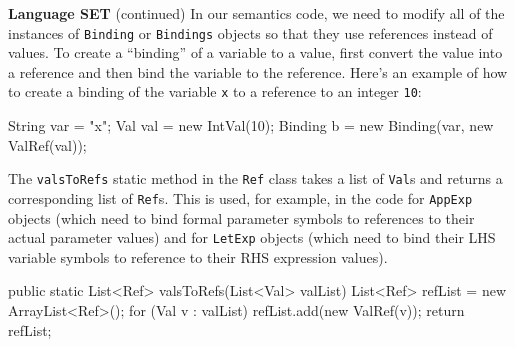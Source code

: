 \begin{minipage}[t]{\sw}
\slidenumber
\LARGE
{\bf Language SET} (continued)\exx
In our semantics code,
we need to modify all of the instances
of \verb'Binding' or \verb'Bindings' objects
so that they use references instead of values.
To create a ``binding'' of a variable to a value,
first convert the value into a reference
and then bind the variable to the reference.
Here's an example of how to create a binding of the variable \verb'x'
to a reference to an integer \verb'10':
\begin{qv}
String var = "x";
Val val = new IntVal(10);
Binding b = new Binding(var, new ValRef(val));
\end{qv}
The \verb'valsToRefs' static method
in the \verb'Ref' class takes a list of \verb'Val's
and returns a corresponding list of \verb'Ref's.
This is used, for example,
in the code for \verb'AppExp' objects
(which need to bind formal parameter symbols
to references to their actual parameter values)
and for \verb'LetExp' objects
(which need to bind their LHS variable symbols
to reference to their RHS expression values).
\begin{qv}
public static List<Ref> valsToRefs(List<Val> valList) {
    List<Ref> refList = new ArrayList<Ref>();
    for (Val v : valList)
        refList.add(new ValRef(v));
    return refList;
}
\end{qv}
\end{minipage}
